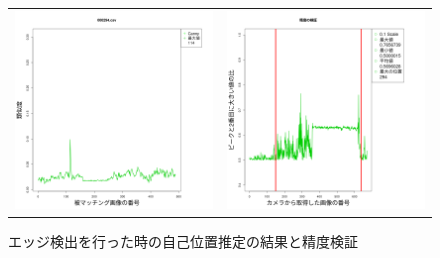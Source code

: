 \documentclass[titlepage,dvipdfmx]{jsarticle}
\begin{document}
\begin{figure}[H]
  \centering
  \begin{tabular}{cc}
    \begin{minipage}[b]{0.5\linewidth}
      \centering
      \includegraphics[pagebox=cropbox, scale=0.25]{sotuken_png/resultCanny_000294.png}
    \end{minipage}
    &
    \begin{minipage}[b]{0.5\linewidth}
      \centering
      \includegraphics[pagebox=cropbox, scale=0.25]{sotuken_png/peak/peak_Canny.png}
    \end{minipage}
  \end{tabular}
  \caption{エッジ検出を行った時の自己位置推定の結果と精度検証}
  \label{CannyR}
\end{figure}
\end{document}
